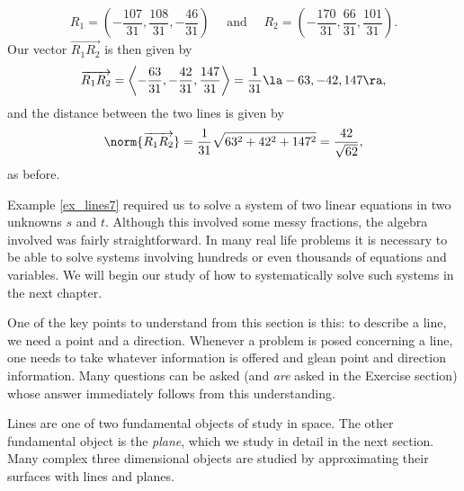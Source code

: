 {\[
R_1 = \left(-\frac{107}{31}, \frac{108}{31}, -\frac{46}{31}\right) \quad \text{ and } \quad R_2 = \left(-\frac{170}{31}, \frac{66}{31}, \frac{101}{31}\right).
\]
Our vector $\overrightarrow{R_1R_2}$ is then given by
\[
\overrightarrow{R_1R_2} = \left\langle -\frac{63}{31}, -\frac{42}{31}, \frac{147}{31}\right\rangle = \frac{1}{31}\la -63, -42, 147\ra,
\]
and the distance between the two lines is given by
\[
\norm{\overrightarrow{R_1R_2}} = \frac{1}{31}\sqrt{63^2+42^2+147^2} = \frac{42}{\sqrt{62}},
\]
as before.
}\\



Example \ref{ex_lines7} required us to solve a system of two linear equations in two unknowns $s$ and $t$. Although this involved some messy fractions, the algebra involved was fairly straightforward. In many real life problems it is necessary to be able to solve systems involving hundreds or even thousands of equations and variables. We will begin our study of how to systematically solve such systems in the next chapter.


One of the key points to understand from this section is this: to describe a line, we need a point and a direction. Whenever a problem is posed concerning a line, one  needs to take whatever information is offered and glean point and direction information. Many questions can be asked (and \emph{are} asked in the Exercise section) whose answer immediately follows from this understanding. 

Lines are one of two fundamental objects of study in space. The other fundamental object is the \emph{plane}, which we study in detail in the next section. Many complex three dimensional objects are studied by approximating their surfaces with lines and planes.





